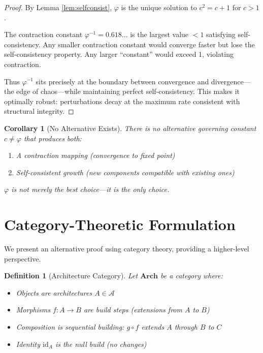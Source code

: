 \documentclass[12pt]{article}
\newtheorem{corollary}[theorem]{Corollary}
\newtheorem{definition}[theorem]{Definition}
\newcommand{\PHI}{\varphi}
\newcommand{\PHIINV}{\varphi^{-1}}
\newcommand{\Arch}{\mathcal{A}}
\begin{document}
\begin{proof}
By Lemma \ref{lem:selfconsist}, $\PHI$ is the unique solution to $c^2 = c + 1$ for $c > 1$.

The contraction constant $\PHIINV = 0.618...$ is the largest value $< 1$ satisfying self-consistency. Any smaller contraction constant would converge faster but lose the self-consistency property. Any larger ``constant'' would exceed 1, violating contraction.

Thus $\PHIINV$ sits precisely at the boundary between convergence and divergence—the edge of chaos—while maintaining perfect self-consistency. This makes it optimally robust: perturbations decay at the maximum rate consistent with structural integrity.
\end{proof}

\begin{corollary}[No Alternative Exists]
There is no alternative governing constant $c \neq \PHI$ that produces both:
\begin{enumerate}
    \item A contraction mapping (convergence to fixed point)
    \item Self-consistent growth (new components compatible with existing ones)
\end{enumerate}
$\PHI$ is not merely the best choice—it is the \emph{only} choice.
\end{corollary}

\section{Category-Theoretic Formulation}

We present an alternative proof using category theory, providing a higher-level perspective.

\begin{definition}[Architecture Category]
Let $\mathbf{Arch}$ be a category where:
\begin{itemize}
    \item Objects are architectures $A \in \Arch$
    \item Morphisms $f: A \to B$ are build steps (extensions from $A$ to $B$)
    \item Composition is sequential building: $g \circ f$ extends $A$ through $B$ to $C$
    \item Identity $\text{id}_A$ is the null build (no changes)
\end{itemize}
\end{definition}
\end{document}
